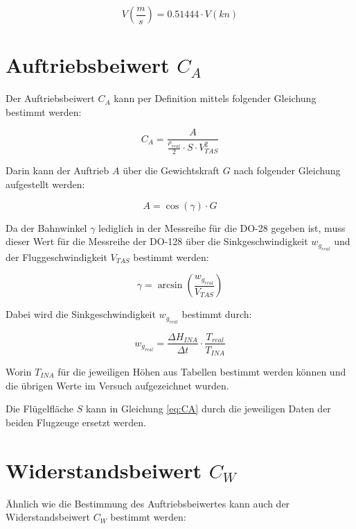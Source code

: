 \begin{equation}
V\left(\frac{m}{s}\right)=0.51444 \cdot V\left(kn\right)
\end{equation}


\section{Auftriebsbeiwert $C_A$}

Der Auftriebsbeiwert $C_A$ kann per Definition mittels folgender Gleichung bestimmt werden\cite{Skript}:

\begin{equation}
C_A=\frac{A}{\frac{\rho_{real}}{2} \cdot S \cdot V_{TAS}^2}
\label{eq:CA}
\end{equation}

Darin kann der Auftrieb $A$ über die Gewichtskraft $G$ nach folgender Gleichung aufgestellt werden:

\begin{equation}
A=\cos(\gamma) \cdot G
\label{eq:A}
\end{equation}

Da der Bahnwinkel $\gamma$ lediglich in der Messreihe für die DO-28 gegeben ist, muss dieser Wert für die Messreihe der DO-128 über die Sinkgeschwindigkeit $w_{g_{real}}$ und der Fluggeschwindigkeit $V_{TAS}$ bestimmt werden:

\begin{equation}
\gamma=\arcsin\left(\frac{w_{g_{real}}}{V_{TAS}}\right)
\label{eq:gamma}
\end{equation} 

Dabei wird die Sinkgeschwindigkeit $w_{g_{real}}$ bestimmt durch\cite{Kurzskript}:

\begin{equation}
w_{g_{real}}=\frac{\Delta H_{INA}}{\Delta t} \cdot \frac{T_{real}}{T_{INA}}
\end{equation}

Worin $T_{INA}$ für die jeweiligen Höhen aus Tabellen bestimmt werden können und die übrigen Werte im Versuch aufgezeichnet wurden.

Die Flügelfläche $S$ kann in Gleichung \ref{eq:CA} durch die jeweiligen Daten der beiden Flugzeuge ersetzt werden.

\section{Widerstandsbeiwert $C_W$}

Ähnlich wie die Bestimmung des Auftriebsbeiwertes kann auch der Widerstandsbeiwert $C_W$ bestimmt werden:

